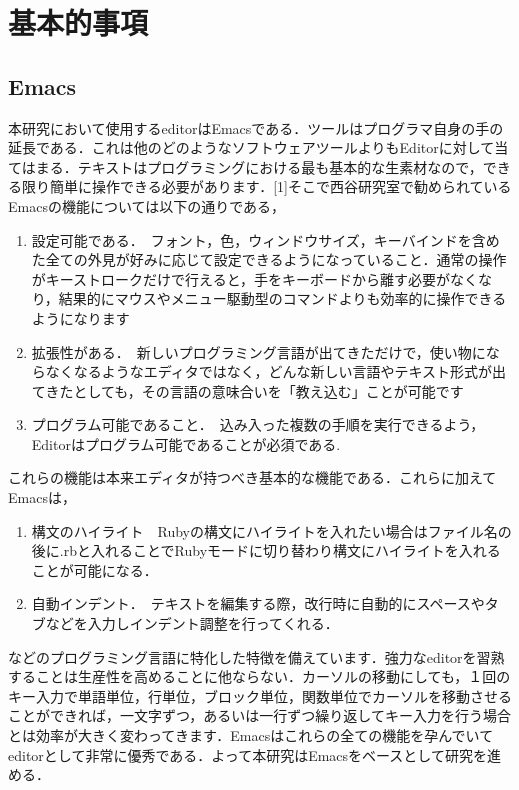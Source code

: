 \chapter{基本的事項}\label{ux57faux672cux7684ux4e8bux9805}

    \section{Emacs}\label{emacs}

    本研究において使用するeditorはEmacsである．ツールはプログラマ自身の手の延長である．これは他のどのようなソフトウェアツールよりもEditorに対して当てはまる．テキストはプログラミングにおける最も基本的な生素材なので，できる限り簡単に操作できる必要があります．{[}1{]}そこで西谷研究室で勧められているEmacsの機能については以下の通りである，

\begin{enumerate}
\def\labelenumi{\arabic{enumi}.}
\tightlist
\item
  設定可能である．　フォント，色，ウィンドウサイズ，キーバインドを含めた全ての外見が好みに応じて設定できるようになっていること．通常の操作がキーストロークだけで行えると，手をキーボードから離す必要がなくなり，結果的にマウスやメニュー駆動型のコマンドよりも効率的に操作できるようになります
\item
  拡張性がある．　新しいプログラミング言語が出てきただけで，使い物にならなくなるようなエディタではなく，どんな新しい言語やテキスト形式が出てきたとしても，その言語の意味合いを「教え込む」ことが可能です
\item
  プログラム可能であること．　込み入った複数の手順を実行できるよう，Editorはプログラム可能であることが必須である.
\end{enumerate}

これらの機能は本来エディタが持つべき基本的な機能である．これらに加えてEmacsは，

\begin{enumerate}
\def\labelenumi{\arabic{enumi}.}
\tightlist
\item
  構文のハイライト　Rubyの構文にハイライトを入れたい場合はファイル名の後に.rbと入れることでRubyモードに切り替わり構文にハイライトを入れることが可能になる．
\item
  自動インデント．　テキストを編集する際，改行時に自動的にスペースやタブなどを入力しインデント調整を行ってくれる．
\end{enumerate}

などのプログラミング言語に特化した特徴を備えています．強力なeditorを習熟することは生産性を高めることに他ならない．カーソルの移動にしても，１回のキー入力で単語単位，行単位，ブロック単位，関数単位でカーソルを移動させることができれば，一文字ずつ，あるいは一行ずつ繰り返してキー入力を行う場合とは効率が大きく変わってきます．Emacsはこれらの全ての機能を孕んでいてeditorとして非常に優秀である．よって本研究はEmacsをベースとして研究を進める．

